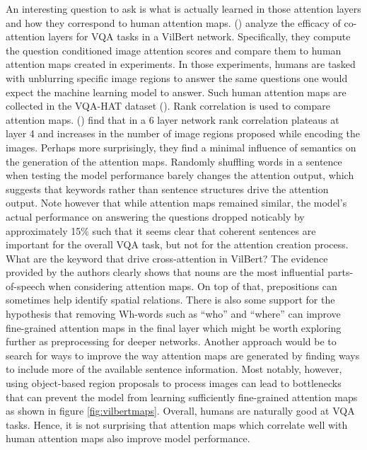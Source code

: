 \documentclass[
]{krantz}
\begin{document}
An interesting question to ask is what is actually learned in those attention layers and how they correspond to human attention maps. (\citet{sikarwar2022efficacy}) analyze the efficacy of co-attention layers for VQA tasks in a VilBert network. Specifically, they compute the question conditioned image attention scores and compare them to human attention maps created in experiments. In those experiments, humans are tasked with unblurring specific image regions to answer the same questions one would expect the machine learning model to answer. Such human attention maps are collected in the VQA-HAT dataset (\citet{das2017human}). Rank correlation is used to compare attention maps. (\citet{sikarwar2022efficacy}) find that in a 6 layer network rank correlation plateaus at layer 4 and increases in the number of image regions proposed while encoding the images. Perhaps more surprisingly, they find a minimal influence of semantics on the generation of the attention maps.
Randomly shuffling words in a sentence when testing the model performance barely changes the attention output, which suggests that keywords rather than sentence structures drive the attention output. Note however that while attention maps remained similar, the model's actual performance on answering the questions dropped noticably by approximately 15\% such that it seems clear that coherent sentences are important for the overall VQA task, but not for the attention creation process. What are the keyword that drive cross-attention in VilBert? The evidence provided by the authors clearly shows that nouns are the most influential parts-of-speech when considering attention maps. On top of that, prepositions can sometimes help identify spatial relations. There is also some support for the hypothesis that removing Wh-words such as ``who'' and ``where'' can improve fine-grained attention maps in the final layer which might be worth exploring further as preprocessing for deeper networks. Another approach would be to search for ways to improve the way attention maps are generated by finding ways to include more of the available sentence information. Most notably, however, using object-based region proposals to process images can lead to bottlenecks that can prevent the model from learning sufficiently fine-grained attention maps as shown in figure \ref{fig:vilbertmaps}. Overall, humans are naturally good at VQA tasks. Hence, it is not surprising that attention maps which correlate well with human attention maps also improve model performance.
\end{document}
